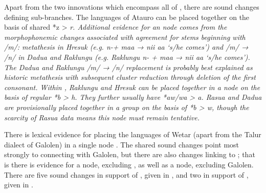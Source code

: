 \clearpage
Apart from the two innovations which encompass all of ,
there are sound changes defining sub-branches.
The languages of Atauro can be placed together on the basis of
shared *z > \it{r.} Additional evidence for an  node
comes from the morphophonemic changes associated with 
agreement for stems beginning with /m/: metathesis in Hresuk (e.g.
\it{n-+ maa → nii aa} ‘s/he comes’)
and /m/ → /n/ in Dadu{\Q}a and Raklungu (e.g.
Raklungu \it{n- + maa → nii aa} ‘s/he comes’).
The Dadu{\Q}a and Raklungu /m/ → /n/ replacement is probably
best explained as historic metathesis with subsequent cluster
reduction through deletion of the first consonant.
Within , Raklungu and Hresuk can be placed together
in a  node on the basis of regular *b > \it{h}.
They further usually have *aw/wa > \it{a}.
Rasua and Dadu{\Q}a are provisionally placed together in a 
group on the basis of *b > \it{w}, though the scarcity of Rasua
data means this node must remain tentative.

There is lexical evidence for placing the languages of Wetar
(apart from the Talur dialect of Galolen) in a single 
node \citep{Hinton2000,Taber1993}.
The shared sound changes point most strongly to connecting 
with Galolen, but there are also changes linking  to ;
that is there is evidence for a  node,
excluding , as well as a  node, excluding Galolen.
There are five sound changes in support of ,
given in , and two in support of , given in .

